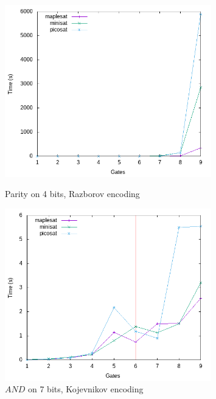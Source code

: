 \documentclass{article}
\begin{document}
\begin{figure}[h!]
\centering

  \includegraphics[width=0.8\textwidth]{images/times/4parity_raz.png}  
  \caption{Parity on 4 bits, Razborov encoding}
  \includegraphics[width=0.8\textwidth]{images/times/7and_kulikov.png}  
  \caption{$AND$ on 7 bits, Kojevnikov encoding}
\end{figure}
\end{document}
